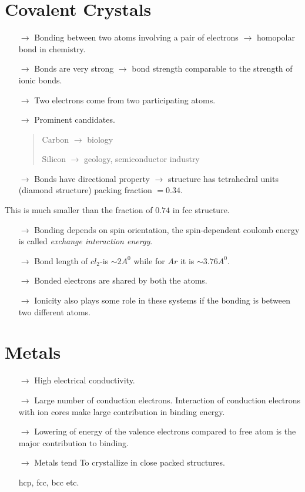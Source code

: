 \section*{Covalent Crystals}
\begin{itemize}
\item[$\to$] Bonding between two atoms involving a pair of electrons $\to$ homopolar bond in chemistry.

\item[$\to$] Bonds are very strong $\to$ bond strength comparable to the strength of ionic bonds.

\item[$\to$] Two electrons come from two participating atoms.

\item[$\to$] Prominent candidates.
\begin{quote}
Carbon $\to$ biology

Silicon $\to$ geology, semiconductor industry
\end{quote}

\item[$\to$] Bonds have directional property $\to$ structure has tetrahedral units (diamond structure) packing fraction $=0.34$. 
\end{itemize}
This is much smaller than the fraction of $0.74$ in fcc structure.
\begin{itemize}
\item[$\to$] Bonding depends on spin orientation, the spin-dependent coulomb energy is called {\em exchange interaction energy}.

\item[$\to$] Bond length of $cl_{2}$-is $\sim 2A^{0}$ while for $Ar$ it is $\sim 3.76A^{0}$.

\item[$\to$] Bonded electrons are shared by both the atoms.

\item[$\to$] Ionicity also plays some role in these systems if the bonding is between two different atoms.
\end{itemize}

\section*{Metals}
\begin{itemize}
\item[$\to$] High electrical conductivity.

\item[$\to$] Large number of conduction electrons. Interaction of conduction electrons with ion cores make large contribution in binding energy.

\item[$\to$] Lowering of energy of the valence electrons compared to free atom is the major contribution to binding.

\item[$\to$] Metals tend To crystallize in close packed structures.

hcp, fcc, bcc etc.
\end{itemize}

